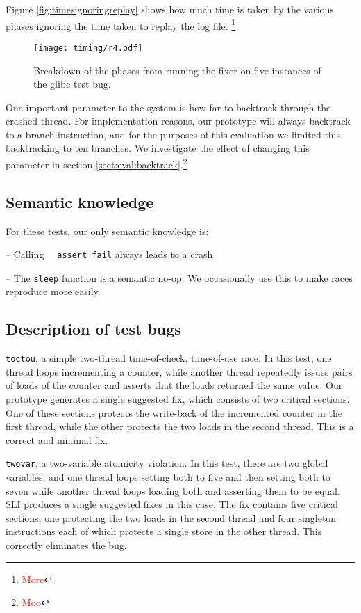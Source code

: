 \documentclass[10pt,twocolumn,preprint,natbib,authoryear]{sigplanconf}
\newcommand{\editorial}[1]{\textcolor{red}{\footnote{\textcolor{red}{#1}}}}
\begin{document}
Figure \ref{fig:timesignoringreplay} shows how much time is taken by
the various phases ignoring the time taken to replay the log file.
\editorial{More}

\begin{figure*}
\texttt{[image: timing/r4.pdf]}
\caption{Breakdown of the phases from running the fixer on five instances
  of the glibc test bug.}
\label{fig:r4}
\end{figure*}

One important parameter to the system is how far to backtrack through
the crashed thread.  For implementation reasons, our prototype will
always backtrack to a branch instruction, and for the purposes of this
evaluation we limited this backtracking to ten branches.  We
investigate the effect of changing this parameter in section
\ref{sect:eval:backtrack}.\editorial{Moo}

\subsection{Semantic knowledge}

For these tests, our only semantic knowledge is:

-- Calling \verb|__assert_fail| always leads to a crash

-- The \verb|sleep| function is a semantic no-op.  We occasionally use
this to make races reproduce more easily.

\subsection{Description of test bugs}

\verb|toctou|, a simple two-thread time-of-check, time-of-use race.
In this test, one thread loops incrementing a counter, while another
thread repeatedly issues pairs of loads of the counter and asserts
that the loads returned the same value.  Our prototype generates a
single suggested fix, which consists of two critical sections.  One of
these sections protects the write-back of the incremented counter in
the first thread, while the other protects the two loads in the second
thread.  This is a correct and minimal fix.

\verb|twovar|, a two-variable atomicity violation.  In this test,
there are two global variables, and one thread loops setting both to
five and then setting both to seven while another thread loops loading
both and asserting them to be equal.  SLI produces a single suggested
fixes in this case.  The fix contains five critical sections, one
protecting the two loads in the second thread and four singleton
instructions each of which protects a single store in the other
thread.  This correctly eliminates the bug.
\end{document}
